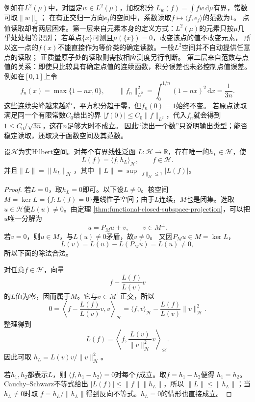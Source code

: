 例如在$L^2(\mu)$中，对固定$w\in L^2(\mu)$，加权积分
$L_w(f)=\int fw\,\mathrm d\mu$有界，常数可取$\lVert w\rVert_2$；
在有正交归一方向$e_j$的空间中，系数读取$f\mapsto\langle f,e_j\rangle$的范数为$1$。
点值读取却有两层困难。第一层来自元素本身的定义方式：$L^2(\mu)$的元素只按$\mu$几乎处处相等识别；
若单点$\{x\}$可测且$\mu(\{x\})=0$，改变该点的值不改变元素，
所以这一点的$f(x)$不能直接作为等价类的确定读数。一般$L^2$空间并不自动提供任意点的读取；
正质量原子处的读取则需按相应测度另行判断。
第二层来自范数与点值的关系：即使只比较具有确定点值的连续函数，积分误差也未必控制点值误差。
例如在$[0,1]$上令
\begin{equation}
  f_n(x)=\max\{1-nx,0\},\qquad
  \lVert f_n\rVert_{L^2}^2
  =\int_0^{1/n}(1-nx)^2\,\mathrm dx=\frac1{3n}.
  \label{eq:functional-point-evaluation-spike}
\end{equation}
这些连续尖峰越来越窄，平方积分趋于零，但$f_n(0)=1$始终不变。
若原点读取满足同一个有限常数$C_0$给出的界
$|f(0)|\leq C_0\lVert f\rVert_{L^2}$，代入$f_n$就会得到
$1\leq C_0/\sqrt{3n}$，这在$n$足够大时不成立。
因此“读出一个数”只说明输出类型；能否稳定读取，还取决于函数空间及其范数。

\begin{theorem}[Riesz表示定理]
\label{thm:functional-riesz-representation}
设$\mathcal{H}$为实Hilbert空间。对每个有界线性泛函
$L:\mathcal{H}\to\mathbb{R}$，存在唯一的$h_L\in\mathcal{H}$，使
\begin{equation}
  L(f)=\langle f,h_L\rangle_{\mathcal{H}},
  \qquad f\in\mathcal{H}.
  \label{eq:functional-riesz-representation}
\end{equation}
并且$\lVert L\rVert=\lVert h_L\rVert_{\mathcal{H}}$，其中
$\lVert L\rVert=\sup_{\lVert f\rVert_{\mathcal{H}}\leq1}|L(f)|$。
\end{theorem}

\begin{proof}
若$L=0$，取$h_L=0$即可。以下设$L\neq0$。核空间
$M=\ker L=\{f:L(f)=0\}$是线性子空间；由于$L$连续，$M$也是闭集。选取
$u\in\mathcal{H}$使$L(u)\neq0$。由定理
\ref{thm:functional-closed-subspace-projection}，可以把$u$唯一分解为
\[
  u=P_Mu+v,\qquad v\in M^\perp.
\]
若$v=0$，则$u\in M$，与$L(u)\neq0$矛盾，故$v\neq0$。
又因$P_Mu\in M=\ker L$，
\[
  L(v)=L(u)-L(P_Mu)=L(u)\neq0,
\]
所以下面的除法合法。

对任意$f\in\mathcal{H}$，向量
\[
  f-\frac{L(f)}{L(v)}v
\]
的$L$值为零，因而属于$M$。它与$v\in M^\perp$正交，所以
\[
  0
  =
  \left\langle
    f-\frac{L(f)}{L(v)}v,v
  \right\rangle_{\mathcal{H}}
  =
  \langle f,v\rangle_{\mathcal{H}}
  -
  \frac{L(f)}{L(v)}\lVert v\rVert_{\mathcal{H}}^2.
\]
整理得到
\[
  L(f)
  =
  \left\langle
    f,\frac{L(v)}{\lVert v\rVert_{\mathcal{H}}^2}v
  \right\rangle_{\mathcal{H}}.
\]
因此可取
$h_L=L(v)v/\lVert v\rVert_{\mathcal{H}}^2$。

若$h_1,h_2$都表示$L$，则
$\langle f,h_1-h_2\rangle=0$对每个$f$成立。取$f=h_1-h_2$便得
$h_1=h_2$。Cauchy--Schwarz不等式给出
$|L(f)|\leq\lVert f\rVert\lVert h_L\rVert$，所以
$\lVert L\rVert\leq\lVert h_L\rVert$；当$h_L\neq0$时取
$f=h_L/\lVert h_L\rVert$得到反向不等式。$h_L=0$的情形也直接成立。
\end{proof}

